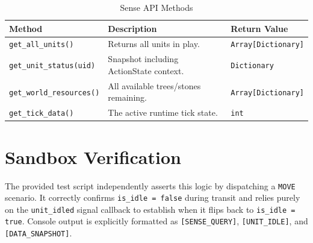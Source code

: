 \documentclass[12pt]{article}
\begin{document}
\begin{table}[h]
\centering
\renewcommand{\arraystretch}{1.5}
\begin{tabularx}{\textwidth}{@{}lXl@{}}
\toprule
\textbf{Method} & \textbf{Description} & \textbf{Return Value} \\
\midrule
\texttt{get\_all\_units()} & Returns all units in play. & \texttt{Array[Dictionary]} \\
\texttt{get\_unit\_status(uid)} & Snapshot including ActionState context. & \texttt{Dictionary} \\
\texttt{get\_world\_resources()} & All available trees/stones remaining. & \texttt{Array[Dictionary]} \\
\texttt{get\_tick\_data()} & The active runtime tick state. & \texttt{int} \\
\bottomrule
\end{tabularx}
\caption{Sense API Methods}
\label{tab:sense_api}
\end{table}

\section{Sandbox Verification}
The provided test script independently asserts this logic by dispatching a \texttt{MOVE} scenario. It correctly confirms \texttt{is\_idle = false} during transit and relies purely on the \texttt{unit\_idled} signal callback to establish when it flips back to \texttt{is\_idle = true}. Console output is explicitly formatted as \texttt{[SENSE\_QUERY]}, \texttt{[UNIT\_IDLE]}, and \texttt{[DATA\_SNAPSHOT]}.
\end{document}
